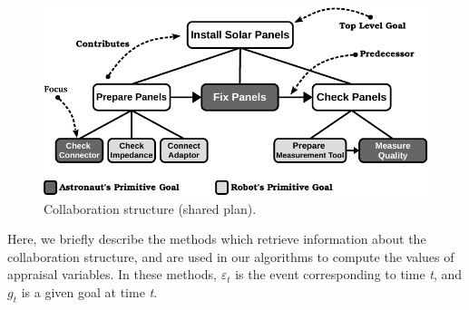 \begin{figure}[tbh]
  \centering
  \includegraphics[width=1\textwidth]{figure/collaborationStructure-croped.pdf}
  \caption{{\fontsize{9}{9}\selectfont Collaboration structure (shared plan).}}
  \label{fig:cs}
\end{figure}

Here, we briefly describe the methods which retrieve information about the
collaboration structure, and are used in our algorithms to compute the values of
appraisal variables. In these methods, $\varepsilon_t$ is the event
corresponding to time \textit{t}, and $g_t$ is a given goal at time \textit{t}.


